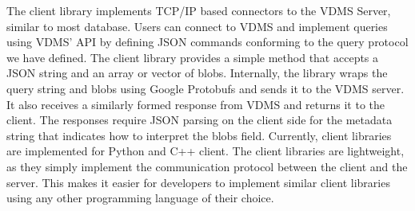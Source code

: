 The client library implements TCP/IP based connectors to the VDMS Server,
similar to most database\cite{memsql, mysql, postgresql}.
Users can connect to VDMS and implement queries using VDMS' API
by defining JSON commands conforming to the query protocol we have defined.
The client library provides a simple method that
accepts a JSON string and an array or vector of blobs.
Internally, the library wraps the query string and blobs using
Google Protobufs \cite{protobufs} and sends it to the VDMS server.
It also receives a similarly formed response from VDMS
and returns it to the client.
The responses require JSON parsing on the client
side for the metadata string that indicates how to interpret the blobs field.
Currently, client libraries are implemented for Python and C++ client.
The client libraries are lightweight, as they simply implement the communication
protocol between the client and the server.
This makes it easier for developers to implement similar client libraries using
any other programming language of their choice.

